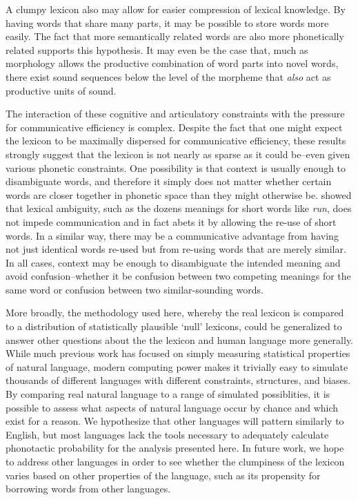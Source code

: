 \documentclass{article}
\begin{document}
A clumpy lexicon also may allow for easier compression of lexical knowledge. By having words that share many
parts, it may be possible to store words more easily. The fact that more semantically related words are also
more phonetically related supports this hypothesis. It may even be the case that, much as morphology allows
the productive combination of word parts into novel words, there exist sound sequences below the level of the
morpheme that \textit{also} act as productive units of sound.

The interaction of these cognitive and articulatory constraints with the pressure for communicative efficiency
is complex. Despite the fact that one might expect the lexicon to be maximally dispersed for communicative
efficiency, these results strongly suggest that the lexicon is not nearly as sparse as it could be--even given
various phonetic constraints. One possibility is that context is usually enough to disambiguate words, and
therefore it simply does not matter whether certain words are closer together in phonetic space than they
might otherwise be. \cite{piantadosi_communicative_2012} showed that lexical ambiguity, such as the dozens
meanings for short words like \textit{run}, does not impede communication and in fact abets it by allowing the
re-use of short words. In a similar way, there may be a communicative advantage from having not just identical
words re-used but from re-using words that are merely similar. In all cases, context may be enough to
disambiguate the intended meaning and avoid confusion--whether it be confusion between two competing meanings
for the same word or confusion between two similar-sounding words.


More broadly, the methodology used here, whereby the real lexicon is compared to a distribution of
statistically plausible `null' lexicons, could be generalized to answer other questions about the the lexicon
and human language more generally. While much previous work has focused on simply measuring statistical
properties of natural language, modern computing power makes it trivially easy to simulate thousands of
different languages with different constraints, structures, and biases. By comparing real natural language to
a range of simulated possiblities, it is possible to assess what aspects of natural language occur by chance
and which exist for a reason. We hypothesize that other languages will pattern similarly to English, but most
languages lack the tools necessary to adequately calculate phonotactic probability for the analysis presented
here. In future work, we hope to address other languages in order to see whether the clumpiness of the lexicon
varies based on other properties of the language, such as its propensity for borrowing words from other
languages.
\end{document}
